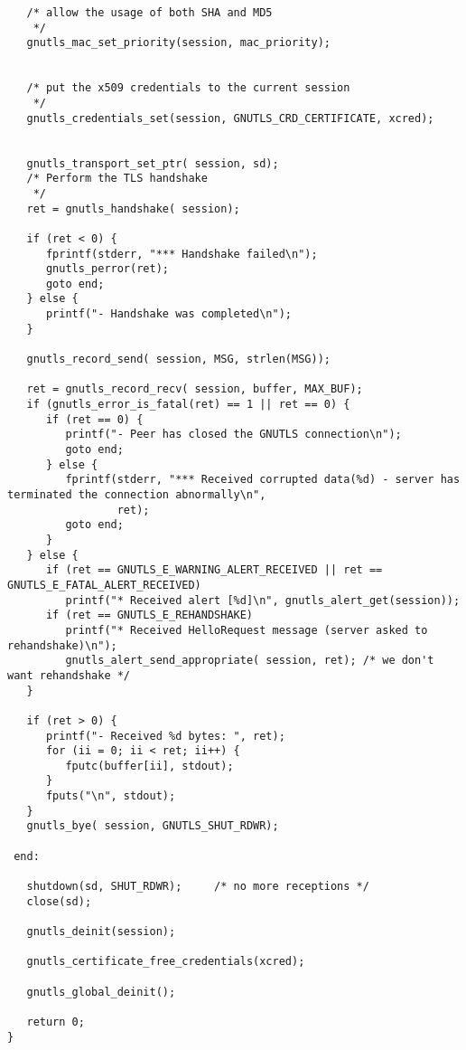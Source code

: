 \begin{verbatim}
   /* allow the usage of both SHA and MD5
    */
   gnutls_mac_set_priority(session, mac_priority);


   /* put the x509 credentials to the current session
    */
   gnutls_credentials_set(session, GNUTLS_CRD_CERTIFICATE, xcred);


   gnutls_transport_set_ptr( session, sd);
   /* Perform the TLS handshake
    */
   ret = gnutls_handshake( session);

   if (ret < 0) {
      fprintf(stderr, "*** Handshake failed\n");
      gnutls_perror(ret);
      goto end;
   } else {
      printf("- Handshake was completed\n");
   }

   gnutls_record_send( session, MSG, strlen(MSG));

   ret = gnutls_record_recv( session, buffer, MAX_BUF);
   if (gnutls_error_is_fatal(ret) == 1 || ret == 0) {
      if (ret == 0) {
         printf("- Peer has closed the GNUTLS connection\n");
         goto end;
      } else {
         fprintf(stderr, "*** Received corrupted data(%d) - server has terminated the connection abnormally\n",
                 ret);
         goto end;
      }
   } else {
      if (ret == GNUTLS_E_WARNING_ALERT_RECEIVED || ret == GNUTLS_E_FATAL_ALERT_RECEIVED)
         printf("* Received alert [%d]\n", gnutls_alert_get(session));
      if (ret == GNUTLS_E_REHANDSHAKE)
         printf("* Received HelloRequest message (server asked to rehandshake)\n");
         gnutls_alert_send_appropriate( session, ret); /* we don't want rehandshake */
   }

   if (ret > 0) {
      printf("- Received %d bytes: ", ret);
      for (ii = 0; ii < ret; ii++) {
         fputc(buffer[ii], stdout);
      }
      fputs("\n", stdout);
   }
   gnutls_bye( session, GNUTLS_SHUT_RDWR);

 end:

   shutdown(sd, SHUT_RDWR);     /* no more receptions */
   close(sd);

   gnutls_deinit(session);

   gnutls_certificate_free_credentials(xcred);

   gnutls_global_deinit();

   return 0;
}

\end{verbatim}
